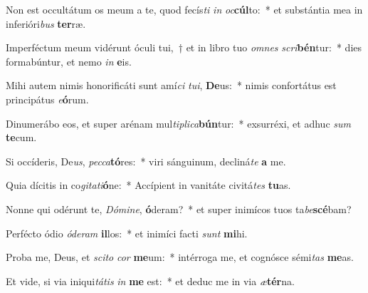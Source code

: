 \item Non est occultátum os meum a te, quod fecís\textit{ti} \textit{in} \textit{oc}\textbf{cúl}to:~* et substántia mea in inferióri\textit{bus} \textbf{ter}ræ.
\item Imperféctum meum vidérunt óculi tui,~† et in libro tuo \textit{om}\textit{nes} \textit{scri}\textbf{bén}tur:~* dies formabúntur, et nemo \textit{in} \textbf{e}is.
\item Mihi autem nimis honorificáti sunt amí\textit{ci} \textit{tu}\textit{i}, \textbf{De}us:~* nimis confortátus est principátus \textit{e}\textbf{ó}rum.
\item Dinumerábo eos, et super arénam mul\textit{ti}\textit{pli}\textit{ca}\textbf{bún}tur:~* exsurréxi, et adhuc \textit{sum} \textbf{te}cum.
\item Si occíderis, De\textit{us}, \textit{pec}\textit{ca}\textbf{tó}res:~* viri sánguinum, decliná\textit{te} \textbf{a} me.
\item Quia dícitis in co\textit{gi}\textit{ta}\textit{ti}\textbf{ó}ne:~* Accípient in vanitáte civitá\textit{tes} \textbf{tu}as.
\item Nonne qui odérunt te, \textit{Dó}\textit{mi}\textit{ne}, \textbf{ó}deram?~* et super inimícos tuos ta\textit{be}\textbf{scé}bam?
\item Perfécto ódio \textit{ó}\textit{de}\textit{ram} \textbf{il}los:~* et inimíci facti \textit{sunt} \textbf{mi}hi.
\item Proba me, Deus, et \textit{sci}\textit{to} \textit{cor} \textbf{me}um:~* intérroga me, et cognósce sémi\textit{tas} \textbf{me}as.
\item Et vide, si via iniqui\textit{tá}\textit{tis} \textit{in} \textbf{me} est:~* et deduc me in via \textit{æ}\textbf{tér}na.
